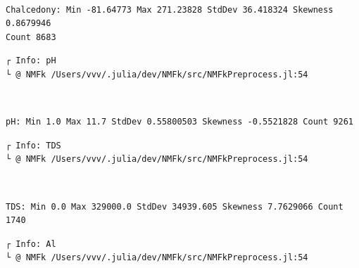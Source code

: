 \documentclass[11pt]{article}
\begin{document}
    \begin{center}
    \end{center}
    { \hspace*{\fill} \\}

    \begin{Verbatim}[commandchars=\\\{\}]
Chalcedony: Min -81.64773 Max 271.23828 StdDev 36.418324 Skewness 0.8679946
Count 8683
    \end{Verbatim}

    \begin{Verbatim}[commandchars=\\\{\}]
┌ Info: pH
└ @ NMFk /Users/vvv/.julia/dev/NMFk/src/NMFkPreprocess.jl:54
    \end{Verbatim}

    \begin{center}
    \end{center}
    { \hspace*{\fill} \\}

    \begin{Verbatim}[commandchars=\\\{\}]
pH: Min 1.0 Max 11.7 StdDev 0.55800503 Skewness -0.5521828 Count 9261
    \end{Verbatim}

    \begin{Verbatim}[commandchars=\\\{\}]
┌ Info: TDS
└ @ NMFk /Users/vvv/.julia/dev/NMFk/src/NMFkPreprocess.jl:54
    \end{Verbatim}

    \begin{center}
    \end{center}
    { \hspace*{\fill} \\}

    \begin{Verbatim}[commandchars=\\\{\}]
TDS: Min 0.0 Max 329000.0 StdDev 34939.605 Skewness 7.7629066 Count 1740
    \end{Verbatim}

    \begin{Verbatim}[commandchars=\\\{\}]
┌ Info: Al
└ @ NMFk /Users/vvv/.julia/dev/NMFk/src/NMFkPreprocess.jl:54
    \end{Verbatim}
\end{document}

